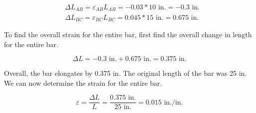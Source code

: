 \documentclass[
  letterpaper,
  DIV=11,
  numbers=noendperiod]{scrreprt}
\begin{document}
\begin{tcolorbox}
\begin{tcolorbox}
\[
\begin{aligned}
& \Delta L_{A B}=\varepsilon_{A B} L_{A B}=-0.03 * 10\text{ in.}=-0.3 \text { in.} \\
& \Delta L_{B C}=\varepsilon_{B C} L_{B C}=0.045 * 15\text{ in.}=0.675 \text{ in.}
\end{aligned}
\]

To find the overall strain for the entire bar, first find the overall
change in length for the entire bar.

\[
\Delta L=-0.3\text{ in.}+0.675\text{ in.}=0.375 \text { in.}
\]

Overall, the bar elongates by 0.375 in. The original length of the bar
was 25 in. We can now determine the strain for the entire bar.

\[
\varepsilon=\frac{\Delta L}{L}=\frac{0.375\text{ in.}}{25\text{ in.}}=0.015 \text{ in./in.}
\]

\end{tcolorbox}

\end{tcolorbox}
\end{document}
